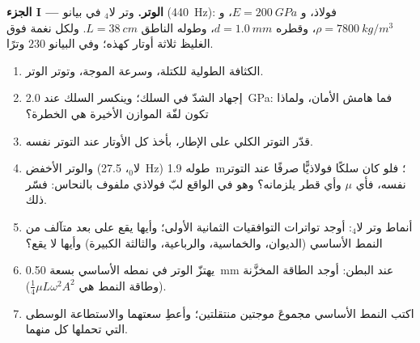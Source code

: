 \begin{problem}
\label{pb:b2:waves-on-strings:1}

\medskip
\noindent\textbf{الجزء I --- الوتر.}
وتر لا$_4$ في بيانو (\qty{440}{Hz}): فولاذ، و $E = \qty{200}{GPa}$، و $\rho =
\qty{7800}{kg/m^3}$، وقطره $d = \qty{1.0}{mm}$، وطوله الناطق $L =
\qty{38}{cm}$. ولكل نغمة فوق الغليظ ثلاثة أوتار كهذه؛ وفي البيانو
$230$ وترًا.
\begin{enumerate}
  \item الكثافة الطولية للكتلة، وسرعة الموجة، وتوتر الوتر.
  \item إجهاد الشدّ في السلك؛ وينكسر السلك عند \qty{2.0}{GPa}: فما
        هامش الأمان، ولماذا تكون لفّة الموازن الأخيرة هي
        الخطرة؟
  \item قدّر التوتر الكلي على الإطار، بأخذ كل الأوتار عند
        التوتر نفسه.
  \item والوتر الأخفض (لا$_0$، \qty{27.5}{Hz}) طوله \qty{1.9}{m}؛ فلو
        كان سلكًا فولاذيًّا صرفًا عند التوتر نفسه، فأي $\mu$ وأي
        قطر يلزمانه؟ وهو في الواقع لبّ فولاذي ملفوف
        بالنحاس: فسّر ذلك.
  \item أنماط وتر لا$_4$: أوجد تواترات التوافقيات الثمانية
        الأولى؛ وأيها يقع على بعد متآلف من النمط الأساسي
        (الديوان، والخماسية، والرباعية، والثالثة الكبيرة) وأيها لا
        يقع؟
  \item يهتزّ الوتر في نمطه الأساسي بسعة
        \qty{0.50}{mm} عند البطن: أوجد الطاقة المخزَّنة (وطاقة
        النمط هي $\tfrac14\mu L\omega^2A^2$).
  \item اكتب النمط الأساسي مجموعَ موجتين منتقلتين؛ وأعطِ
        سعتهما والاستطاعة الوسطى التي تحملها كل منهما.
\end{enumerate}


\end{problem}
